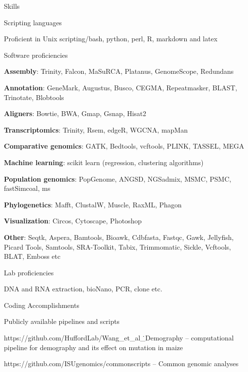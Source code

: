 \documentclass{resume} %
\begin{document}
\begin{rSection}{Skills} \itemsep -3pt
\begin{rSubsection}{Scripting languages}{}{}{}
\item Proficient in  Unix scripting/bash, python, perl, R, markdown and latex 
\end{rSubsection}

\begin{rSubsection}{Software proficiencies}{}{}{}
\item \textbf{Assembly}: Trinity, Falcon, MaSuRCA, Platanus, GenomeScope, Redundans  
\item \textbf{Annotation}: GeneMark, Augustus, Busco, CEGMA, Repeatmasker, BLAST, Trinotate, Blobtools
\item \textbf{Aligners}: Bowtie, BWA, Gmap, Gsnap, Hisat2
\item \textbf{Transcriptomics}: Trinity, Rsem, edgeR, WGCNA, mapMan
\item \textbf{Comparative genomics}: GATK, Bedtools, vcftools, PLINK, TASSEL, MEGA
\item \textbf{Machine learning}: scikit learn (regression, clustering algorithms)
\item \textbf{Population genomics}: PopGenome, ANGSD, NGSadmix, MSMC, PSMC, fastSimcoal, ms
\item \textbf{Phylogenetics}: Mafft, ClustalW, Muscle, RaxML, Phagon  
\item \textbf{Visualization}: Circos, Cytoscape, Photoshop
\item \textbf{Other}: Seqtk, Aspera, Bamtools, Bioawk, Cdbfasta, Fastqc, Gawk, Jellyfish, Picard Tools, Samtools, SRA-Toolkit, Tabix, Trimmomatic, Sickle, Vcftools, BLAT, Emboss etc 
\end{rSubsection}

\begin{rSubsection}{Lab proficiencies}{}{}{}
\item DNA and RNA extraction, bioNano, PCR, clone etc. 
\end{rSubsection}

\end{rSection}




\begin{rSection}{Coding Accomplishments}

\begin{rSubsection}{Publicly available pipelines and scripts }{}{}{}
\item {https://github.com/HuffordLab/Wang\_et\_al\.\_Demography -- computational pipeline for demography and its effect on mutation in maize}
\item {https://github.com/ISUgenomics/commonscripts -- Common genomic analyses}
\end{rSubsection}{}

\end{rSection}
\end{document}
